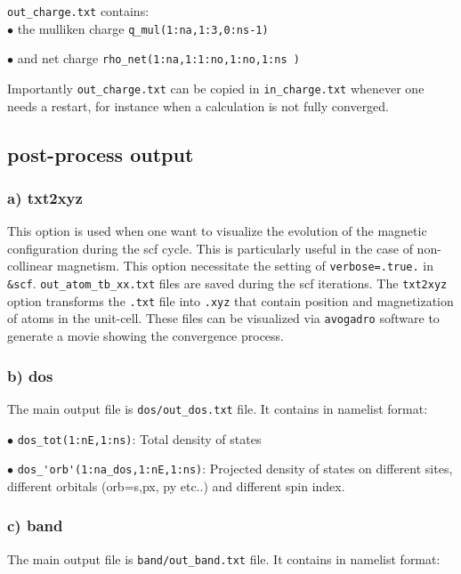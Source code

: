 \documentclass[12pt, onecolumn]{memoir}
\begin{document}
 \noindent
\verb+out_charge.txt+ contains: \\

$\bullet$ the mulliken charge \verb+q_mul(1:na,1:3,0:ns-1)+

$\bullet$ and net charge \verb+rho_net(1:na,1:1:no,1:no,1:ns )+

 \noindent
 Importantly \verb+out_charge.txt+ can be copied in \verb+in_charge.txt+ whenever one needs a restart, for instance when a calculation is not fully converged.
 
\subsection{post-process output}

\subsubsection{a) txt2xyz}

\noindent
This option is used when one want to visualize the evolution of the  magnetic configuration during the scf cycle. This is particularly useful in the case of non-collinear magnetism. This option necessitate the setting of \verb+verbose=.true.+ in \verb+&scf+. \verb+out_atom_tb_xx.txt+ files are saved during the scf iterations. The \verb+txt2xyz+ option transforms the \verb+.txt+ file into \verb+.xyz+ that contain position and magnetization of atoms in the unit-cell. These files can be visualized via \verb+avogadro+ software to generate a movie showing the convergence process.

\subsubsection{b) dos}

\noindent
The main output file is \verb+dos/out_dos.txt+ file. It contains in namelist format:

$\bullet$ \verb+dos_tot(1:nE,1:ns)+: Total density of states

$\bullet$  \verb+dos_'orb'(1:na_dos,1:nE,1:ns)+: Projected density of states on different sites, different orbitals (orb=s,px, py etc..) and different spin index.

\subsubsection{c) band}

\noindent
The main output file is \verb+band/out_band.txt+ file. It contains in namelist format:
\end{document}
